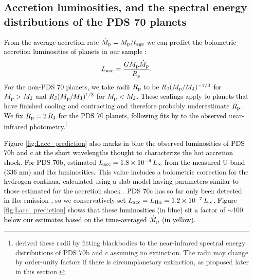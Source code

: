 \documentclass[fleqn,usenatbib]{mnras}
\newcommand{\nick}[1]{\textcolor{black}{ #1}}
\begin{document}
\subsection{Accretion luminosities, and the spectral energy distributions of the PDS 70 planets}
\label{subsec:observables}
\nick{From the average accretion rate $\dot{M}_{\rm p} = M_{\rm p}/t_{\rm age}$ we can predict the bolometric accretion luminosities of planets in our sample \citep[e.g.][]{frank_king_raine}:
\begin{equation}
    L_{\rm acc} = \frac{GM_{\rm p}\dot{M}_{\rm p}}{R_{\rm p}}.
\end{equation}
For the non-PDS 70 planets, we take radii $R_{\rm p}$ to be $R_{\rm J}(M_{\rm p}/M_{\rm J})^{-1/3}$ for $M_{\rm p} > M_{\rm J}$ and $R_{\rm J}(M_{\rm p}/M_{\rm J})^{1/3}$ for $M_{\rm p} < M_{\rm J}$. These scalings apply to planets that have finished cooling and contracting \citep[e.g.][]{ginzburg_chiang_2019b} and therefore probably underestimate 
$R_{\rm p}$. We fix $R_{\rm p} = 2\,R_{\rm J}$ for the PDS 70 planets, following fits by \cite{wang_etal_2020} to the observed near-infrared photometry.\footnote{\citet{wang_etal_2020} derived these radii by fitting blackbodies to the near-infrared spectral energy distributions of PDS 70b and c assuming no extinction. The radii may change by order-unity factors if there is circumplanetary extinction, as proposed later in this section.} 
}

\nick{Figure \ref{fig:Lacc_prediction} also marks in blue the observed luminosities of PDS 70b and c at the short wavelengths thought to characterize the hot accretion shock. For PDS 70b, \cite{zhou_etal_2021} estimated $L_{\rm acc} = 1.8 \times 10^{-6}\,L_{\odot}$ from the measured U-band (336 nm) and H$\alpha$ luminosities. This value includes a bolometric correction for the hydrogen continua, calculated using a slab model \citep{valenti_etal_1993} having parameters similar to those estimated for the accretion shock \citep{aoyama_ikoma_2019}. PDS 70c has so far only been detected in H$\alpha$ emission \citep{hashimoto_etal_2020}, so we conservatively set $L_{\rm acc} = L_{\rm H\alpha} = 1.2 \times 10^{-7}\,L_{\odot}$. Figure \ref{fig:Lacc_prediction} shows that these luminosities (in blue) sit a factor of $\sim$100 below our estimates based on the time-averaged $\dot{M}_{\rm p}$ (in yellow).}
\end{document}
